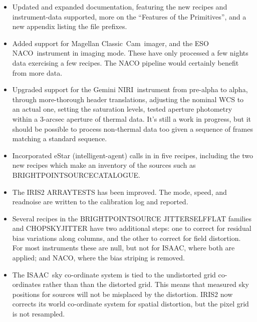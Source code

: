\documentclass[twoside,11pt]{article}
\newcommand{\htmladdnormallink}[2]{#1}
\newcommand{\htmlref}[2]{#1}
\renewcommand{\_}{\texttt{\symbol{95}}}
\newcommand{\ClassicCam}{\htmladdnormallink{Classic~Cam}{http://www.ociw.edu/lco/magellan/instruments/Classic_Cam/}}
\newcommand{\ISAAC}{\htmladdnormallink{ISAAC}{http://www.eso.org/instruments/isaac/}}
\newcommand{\NACO}{\htmladdnormallink{NACO}{http://www.eso.org/instruments/naco/}}
\newcommand{\NIRI}{\htmladdnormallink{NIRI}{http://www.gemini.edu/sciops/instruments/niri/}}
\begin{document}
\begin{itemize}
   \item Updated and expanded documentation, featuring the new recipes
   and instrument-data supported, more on the \htmlref{``Features of
   the Primitives''}{features_of_the_primitives}, and a new appendix
   listing the \htmlref{file prefixes}{file_prefixes}.

   \item Added support for Magellan \ClassicCam\ imager, and the ESO
   \NACO\ instrument in imaging mode.  These have only processed
   a few nights data exercising a few recipes.  The NACO pipeline
   would certainly benefit from more data.

   \item Upgraded support for the Gemini \NIRI\ instrument from
   pre-alpha to alpha, through more-thorough header translations,
   adjusting the nominal WCS to an actual one, setting the saturation
   levels, tested aperture photometry within a 3-arcsec aperture
   of thermal data.  It's still a work in progress, but it should be
   possible to process non-thermal data too given a sequence of frames
   matching a standard sequence.

   \item Incorporated eStar (intelligent-agent) calls in 
   in five recipes, including the two new recipes which make an
   inventory of the sources such as
   \htmlref{BRIGHT\_POINT\_SOURCE\_CATALOGUE}{BRIGHT\_POINT\_SOURCE\_CATALOGUE}.

   \item The IRIS2 ARRAY\_TESTS has been improved.  The mode, speed,
   and readnoise are written to the calibration log and reported.
   
   \item Several recipes in the \htmlref{BRIGHT\_POINT\_SOURCE}{BRIGHT\_POINT\_SOURCE} 
   \htmlref{JITTER\_SELF\_FLAT}{JITTER\_SELF\_FLAT} families
   and \htmlref{CHOP\_SKY\_JITTER}{CHOP\_SKY\_JITTER}
   have two additional steps: one to correct for residual bias
   variations along columns, and the other to correct for field
   distortion.  For most instruments these are null, but not for
   \ISAAC, where both are applied; and NACO, where the bias striping is
   removed. 

   \item The \ISAAC\ sky co-ordinate system is tied to the undistorted
   grid co-ordinates rather than than the distorted grid.  This means
   that measured sky positions for sources will not be misplaced by the
   distortion. IRIS2 now corrects its world co-ordinate system for
   spatial distortion, but the pixel grid is not resampled.


\end{itemize}
\end{document}
